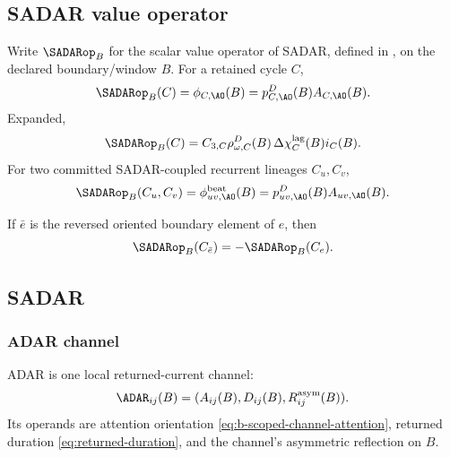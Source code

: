 \subsection{SADAR value operator}\label{subsec:sadar-operator}
\begin{definition}
Write \(\SADARop_B\) for the scalar value operator of SADAR, defined in , on the declared boundary/window \(B\). For a retained cycle \(C\),
\begin{equation}
\SADARop_B(C)
=
\phi_{C,\AO}(B)
=
p^D_{C,\AO}(B)A_{C,\AO}(B).
\label{eq:sadar-operator-cycle}
\end{equation}
Expanded,
\begin{equation}
\SADARop_B(C)
=
C_{3,C}\rho^D_{\omega,C}(B)\,\Delta\chi_C^{\mathrm{lag}}(B)i_C(B).
\label{eq:sadar-operator-expanded}
\end{equation}
For two committed SADAR-coupled recurrent lineages \(C_u,C_v\),
\begin{equation}
\SADARop_B(C_u,C_v)
=
\phi^{\mathrm{beat}}_{uv,\AO}(B)
=
p^D_{uv,\AO}(B)A_{uv,\AO}(B).
\label{eq:sadar-operator-beat-coupling}
\end{equation}
\end{definition}
If \(\bar e\) is the reversed oriented boundary element of \(e\), then
\begin{equation}
\SADARop_B(C_{\bar e})=-\SADARop_B(C_e).
\label{eq:sadar-orientation-antisymmetry}
\end{equation}


\subsection{SADAR}\label{sec:field:sadar}
\label{subsec:sadar}

\subsubsection{ADAR channel}\label{subsec:adar-channel}
\begin{definition}[ADAR]
ADAR is one local returned-current channel:
\begin{equation}
\ADAR_{ij}(B)=(A_{ij}(B),D_{ij}(B),R^{\mathrm{asym}}_{ij}(B)).
\label{eq:adar-channel}
\end{equation}
Its operands are attention orientation \eqref{eq:b-scoped-channel-attention},
returned duration \eqref{eq:returned-duration}, and the channel's asymmetric
reflection on \(B\).
\end{definition}

